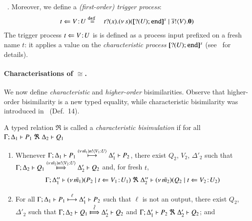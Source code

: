 \documentclass[runningheads]{llncs}
\begin{document}
{~\cite{characteristic_bis}.
Moreover, we define a \emph{(first-order) trigger process}:
%
\begin{eqnarray}
	t \Leftarrow V \! : \! U & \stackrel{\mathtt{def}\ }{=} &  t ? (x) . (\nu\, s)([\!\![? (U) ; \mathtt{end}]\!\!]^{s} \;|\; \overline{s} ! \langle V \rangle . \mathbf{0}) 	\label{eq:fot}
\end{eqnarray}
%
The trigger process $t \Leftarrow V \! : \! U$ is 
is defined as a process input prefixed on
a fresh name $t$: it
applies a value
on the %
\emph{characteristic process} $[\!\![? (U) ; \mathtt{end}]\!\!]^{s}$ (see~\cite{characteristic_bis} for details). 

\paragraph{Characterisations of $\cong$.}
We now define \emph{characteristic} and \emph{higher-order} bisimilarities.
Observe that higher-order bisimilarity is a new typed equality, 
while 
characteristic bisimilarity was introduced in~\cite{characteristic_bis} (Def.~14).

\begin{definition}%
	\label{d:fwb}
	A typed relation $\Re$ is called a {\em  characteristic bisimulation} if 
	for all $\Gamma; \Delta_1 \vdash P_1 \ \Re \  \Delta_2 \vdash Q_1$ 
	\begin{enumerate}[1.]
		\item 
				Whenever 
				$\Gamma; \Delta_1 \vdash P_1 \stackrel{(\nu\, \tilde{m_1}) n ! \langle V_1: U \rangle}{\longmapsto} \Delta_1' \vdash P_2$,
				there exist 
				$Q_2$, $V_2$, $\Delta'_2$
				such that \\
				$\horel{\Gamma}{\Delta_2}{Q_1}{\Hby{\news{\tilde{m_2}} \bactout{n}{V_2: U}}}{\Delta_2'}{Q_2}$ and, for fresh $t$, 
%
				\[
					\begin{array}{lrlll}
						\Gamma; \Delta''_1  \vdash  {(\nu\, \tilde{m_1})(P_2 \;|\;t \Leftarrow V_1 \! : \! U_1)}
						\ \Re \
						\Delta''_2 \vdash {(\nu\, \tilde{m_2})(Q_2 \;|\;t \Leftarrow V_2 \! : \! U_2)}
					\end{array}
				\]

		\item	
				For all $\Gamma; \Delta_1 \vdash P_1 \stackrel{\ell}{\longmapsto} \Delta_1' \vdash P_2$ such that 
				$\ell$ is not an output, 
				there exist $Q_2$, $\Delta'_2$ such that 
				$\horel{\Gamma}{\Delta_2}{Q_1}{\Hby{\hat{\ell}}}{\Delta_2'}{Q_2}$
				and
				$\Gamma; \Delta_1' \vdash P_2 \ \Re \  \Delta_2' \vdash Q_2$; and 


\end{enumerate}
\end{definition}}
\end{document}
